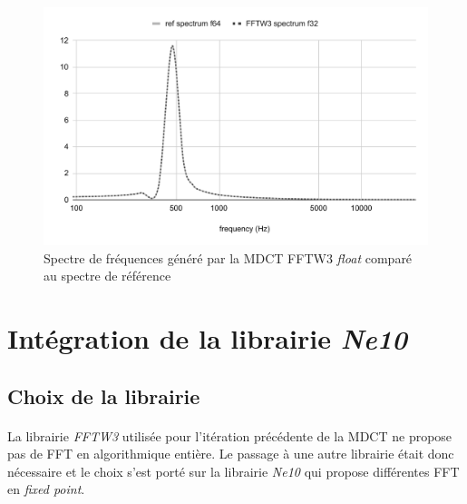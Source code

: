 \documentclass{article}
\begin{document}



    \begin{figure}[H]
        \centering
        \includegraphics[width=.8\linewidth]{./images/validation_fftw_f32.pdf}
        \caption{Spectre de fréquences généré par la MDCT FFTW3 \emph{float} comparé au spectre de référence}
        \label{fig:validation_fftw3_f32}
    \end{figure}


    \newpage
    \section{Intégration de la librairie \emph{Ne10}}
    \subsection{Choix de la librairie}
    \paragraph{}
    La librairie \emph{FFTW3} utilisée pour l'itération précédente de la MDCT ne propose pas de FFT en algorithmique entière. Le passage à une autre librairie était donc nécessaire et le choix s'est porté sur la librairie \emph{Ne10} qui propose différentes FFT en \emph{fixed point}.
\end{document}
